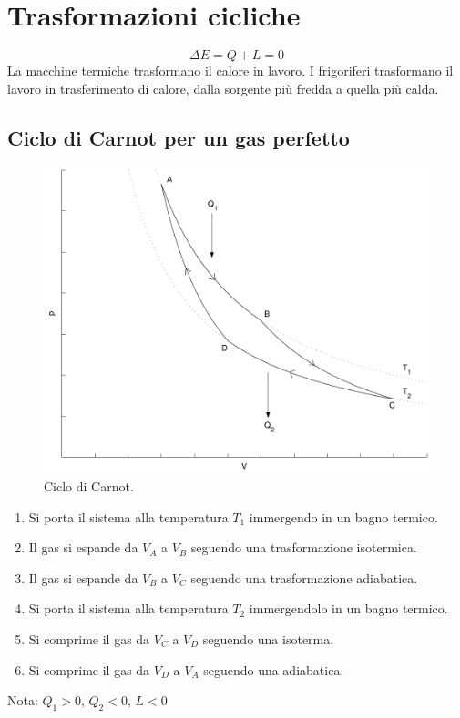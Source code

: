 \section{Trasformazioni cicliche}
\begin{equation}
\Delta E=Q+L=0
\end{equation}
La macchine termiche trasformano il calore in lavoro. I frigoriferi trasformano il lavoro in trasferimento di calore, dalla sorgente più fredda a quella più calda.
\subsection{Ciclo di Carnot per un gas perfetto}
\begin{figure}[htbp]
\centering
\includegraphics[scale=0.5]{immagini/fisica1/Carnot}
\caption{Ciclo di Carnot.}
\end{figure}
\parbox[]{\textwidth}{
\begin{enumerate}
\item Si porta il sistema alla temperatura $T_1$ immergendo in un bagno termico.
\item Il gas si espande da $V_A$ a $V_B$ seguendo una trasformazione isotermica.
\item Il gas si espande da $V_B$ a $V_C$ seguendo una trasformazione adiabatica.
\item Si porta il sistema alla temperatura $T_2$ immergendolo in un bagno termico.
\item Si comprime il gas da $V_C$ a $V_D$ seguendo una isoterma.
\item Si comprime il gas da $V_D$ a $V_A$ seguendo una adiabatica.
\end{enumerate}}
Nota: $Q_1>0$, $Q_2<0$, $L<0$

